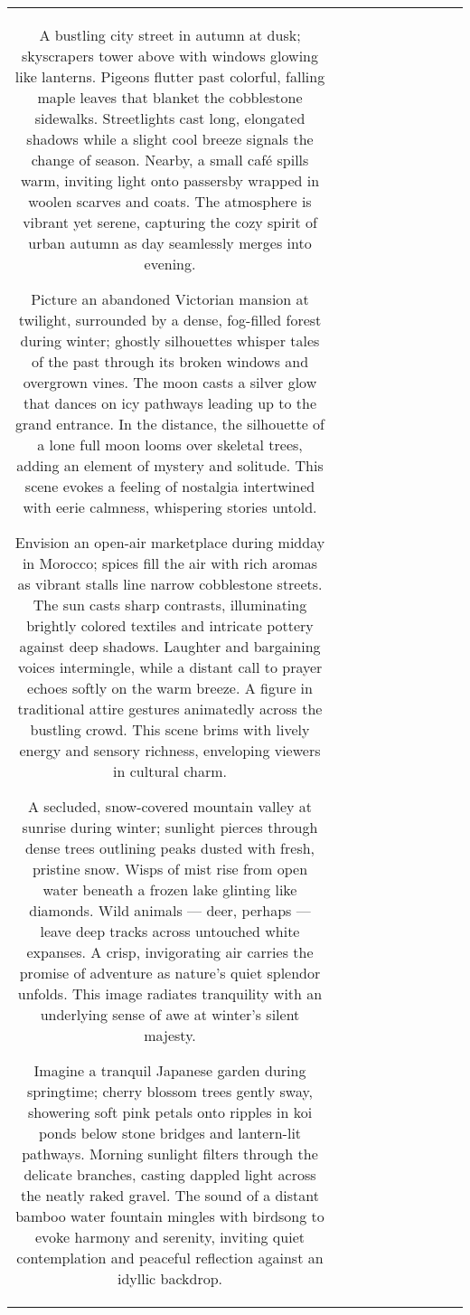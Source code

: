 \begin{table}[h!]
\begin{tabular}{|c|c|c|c|c|c|c|c|c|c|}
A bustling city street in autumn at dusk; skyscrapers tower above with windows glowing like lanterns. Pigeons flutter past colorful, falling maple leaves that blanket the cobblestone sidewalks. Streetlights cast long, elongated shadows while a slight cool breeze signals the change of season. Nearby, a small café spills warm, inviting light onto passersby wrapped in woolen scarves and coats. The atmosphere is vibrant yet serene, capturing the cozy spirit of urban autumn as day seamlessly merges into evening.

Picture an abandoned Victorian mansion at twilight, surrounded by a dense, fog-filled forest during winter; ghostly silhouettes whisper tales of the past through its broken windows and overgrown vines. The moon casts a silver glow that dances on icy pathways leading up to the grand entrance. In the distance, the silhouette of a lone full moon looms over skeletal trees, adding an element of mystery and solitude. This scene evokes a feeling of nostalgia intertwined with eerie calmness, whispering stories untold.

Envision an open-air marketplace during midday in Morocco; spices fill the air with rich aromas as vibrant stalls line narrow cobblestone streets. The sun casts sharp contrasts, illuminating brightly colored textiles and intricate pottery against deep shadows. Laughter and bargaining voices intermingle, while a distant call to prayer echoes softly on the warm breeze. A figure in traditional attire gestures animatedly across the bustling crowd. This scene brims with lively energy and sensory richness, enveloping viewers in cultural charm.

A secluded, snow-covered mountain valley at sunrise during winter; sunlight pierces through dense trees outlining peaks dusted with fresh, pristine snow. Wisps of mist rise from open water beneath a frozen lake glinting like diamonds. Wild animals — deer, perhaps — leave deep tracks across untouched white expanses. A crisp, invigorating air carries the promise of adventure as nature's quiet splendor unfolds. This image radiates tranquility with an underlying sense of awe at winter's silent majesty.

Imagine a tranquil Japanese garden during springtime; cherry blossom trees gently sway, showering soft pink petals onto ripples in koi ponds below stone bridges and lantern-lit pathways. Morning sunlight filters through the delicate branches, casting dappled light across the neatly raked gravel. The sound of a distant bamboo water fountain mingles with birdsong to evoke harmony and serenity, inviting quiet contemplation and peaceful reflection against an idyllic backdrop.


\end{tabular}
\end{table}
